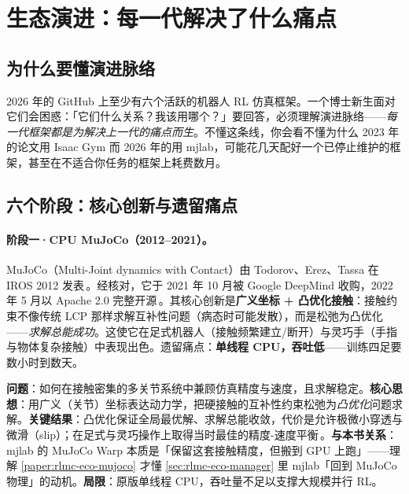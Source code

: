 \section{生态演进：每一代解决了什么痛点}
\label{sec:rlmc-eco-evolution}

\subsection{为什么要懂演进脉络}

2026 年的 GitHub 上至少有六个活跃的机器人 RL 仿真框架。一个博士新生面对它们会困惑：「它们什么关系？我该用哪个？」要回答，必须理解演进脉络——\emph{每一代框架都是为解决上一代的痛点而生}。不懂这条线，你会看不懂为什么 2023 年的论文用 Isaac Gym 而 2026 年的用 mjlab，可能花几天配好一个已停止维护的框架，甚至在不适合你任务的框架上耗费数月。

\subsection{六个阶段：核心创新与遗留痛点}

\paragraph{阶段一·CPU MuJoCo（2012--2021）。}MuJoCo（Multi-Joint dynamics with Contact）由 Todorov、Erez、Tassa 在 IROS 2012 发表\,\cite{todorov2012mujoco}。经核对，它于 2021 年 10 月被 Google DeepMind 收购，2022 年 5 月以 Apache 2.0 完整开源\,\cite{todorov2012mujoco}。其核心创新是\textbf{广义坐标 + 凸优化接触}：接触约束不像传统 LCP 那样求解互补性问题（病态时可能发散），而是松弛为凸优化——\emph{求解总能成功}。这使它在足式机器人（接触频繁建立/断开）与灵巧手（手指与物体复杂接触）中表现出色。遗留痛点：\textbf{单线程 CPU，吞吐低}——训练四足要数小时到数天。

\begin{paper}\label{paper:rlmc-eco-mujoco}
\textbf{问题}：如何在接触密集的多关节系统中兼顾仿真精度与速度，且求解稳定。\textbf{核心思想}：用广义（关节）坐标表达动力学，把硬接触的互补性约束松弛为\emph{凸优化}问题求解。\textbf{关键结果}：凸优化保证全局最优解、求解总能收敛，代价是允许极微小穿透与微滑（slip）；在足式与灵巧操作上取得当时最佳的精度-速度平衡\,\cite{todorov2012mujoco}。\textbf{与本书关系}：mjlab 的 MuJoCo Warp 本质是「保留这套接触精度，但搬到 GPU 上跑」——理解 \cref{paper:rlmc-eco-mujoco} 才懂 \cref{sec:rlmc-eco-manager} 里 mjlab「回到 MuJoCo 物理」的动机。\textbf{局限}：原版单线程 CPU，吞吐量不足以支撑大规模并行 RL。
\end{paper}


